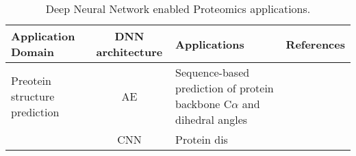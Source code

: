 \begin{table}[h!]
\centering
\begin{tabular}{|| l | c | l | l ||}
    \hline
    Application Domain & DNN architecture & Applications & References\\
    \hline \hline
    Preotein structure prediction & AE & Sequence-based prediction of protein backbone C$\alpha$ and dihedral angles & \\
    & CNN & Protein dis\\
    \hline
\end{tabular}
\caption{Deep Neural Network enabled Proteomics applications.}
\label{tab:PS-DNN}
\end{table}